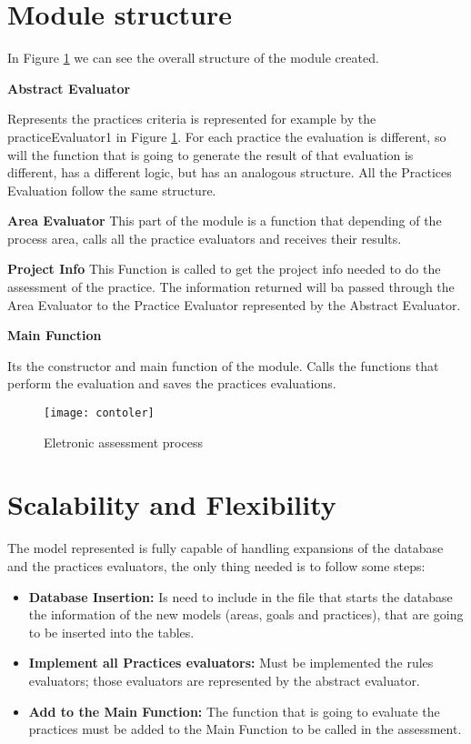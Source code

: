 \section{Module structure}

In Figure \ref{fig:esquema} we can see the overall structure of the module created.

\textbf{Abstract Evaluator}

Represents the practices criteria is represented for example by the practiceEvaluator1 in Figure \ref{fig:esquema}. For each practice the evaluation is different, so will the function that is going to generate the result of that evaluation is different, has a different logic, but has an analogous structure. All the Practices Evaluation follow the same structure.

\textbf{Area Evaluator}
This part of the module is a function that depending of the process area, calls all the practice evaluators and receives their results.


\textbf{Project Info}
This Function is called to get the project info needed to do the assessment of the practice. The information returned will ba passed through the Area Evaluator to the Practice Evaluator represented by the Abstract Evaluator.

\textbf{Main Function}

Its the constructor and main function of the module. Calls the functions that perform the evaluation and saves the practices evaluations.


\begin{figure}[f]
	\begin{center}
		\leavevmode
		\texttt{[image: contoler]}
		\caption{Eletronic assessment process}
		\label{fig:esquema}
	\end{center}
\end{figure}

\section{Scalability and Flexibility}

The model represented is fully capable of handling expansions of the database and the practices evaluators, the only thing needed is to follow some steps:
\begin{itemize}
	\item \textbf{Database Insertion: } Is need to include in the file that starts the database the information of the new models (areas, goals and practices), that are going to be inserted into the tables.
	\item \textbf{Implement all Practices evaluators: } Must be implemented the rules evaluators; those evaluators are represented by the abstract evaluator.
	\item \textbf{Add to the Main Function: } The function that is going to evaluate the practices must be added to the Main Function to be called in the assessment.
\end{itemize}

